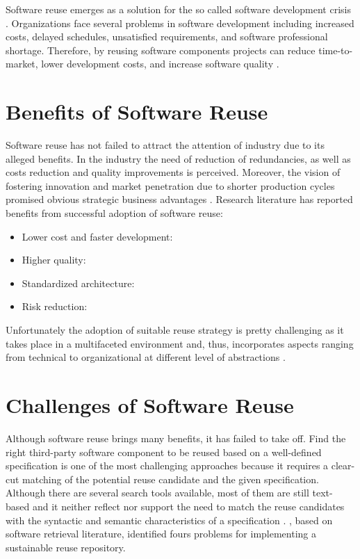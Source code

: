 Software reuse emerges as a solution for the so called software development crisis \citep{Kim1992}. Organizations face several problems in software development including increased costs, delayed schedules, unsatisfied requirements, and software professional shortage. Therefore, by reusing software components projects can reduce time-to-market, lower development costs, and increase software quality \cite{Frakes2005}.

\section{Benefits of Software Reuse}
Software reuse has not failed to attract the attention of industry due to its alleged benefits. In the industry the need of reduction of redundancies, as well as costs reduction and quality improvements is perceived. Moreover, the vision of fostering innovation and market penetration due to shorter production cycles promised obvious strategic business advantages \citep{Bauer2016}. Research literature has reported benefits from successful adoption of software reuse:

\begin{itemize}
\item Lower cost and faster development:
\item Higher quality:
\item Standardized architecture:
\item Risk reduction: 
\end{itemize}

Unfortunately the adoption of suitable reuse strategy is pretty challenging as it takes place in a multifaceted environment and, thus, incorporates aspects ranging from technical to organizational at different level of abstractions \citep{Bauer2016}.

\section{Challenges of Software Reuse}
\label{sec:sw-challenges}
Although software reuse brings many benefits, it has failed to take off. Find the right third-party software component to be reused based on a well-defined specification is one of the most challenging approaches because it requires a clear-cut matching of the potential reuse candidate and the given specification. Although there are several search tools available, most of them are still text-based and it neither reflect nor support the need to match the reuse candidates with the syntactic and semantic characteristics of a specification \citep{Hummel2013}. \cite{Hummel2013}, based on software retrieval literature, identified fours problems for implementing a sustainable reuse repository.

